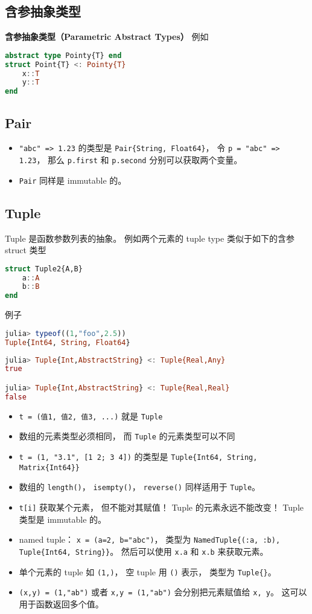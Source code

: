 \subsection{含参抽象类型}
\textbf{含参抽象类型（Parametric Abstract Types）}
例如
\begin{lstlisting}[language=julia]
abstract type Pointy{T} end
struct Point{T} <: Pointy{T}
    x::T
    y::T
end
\end{lstlisting}

\subsection{Pair}
\begin{itemize}
\item \verb|"abc" => 1.23| 的类型是 \verb|Pair{String, Float64}|， 令 \verb|p = "abc" => 1.23|， 那么 \verb|p.first| 和 \verb|p.second| 分别可以获取两个变量。
\item \verb|Pair| 同样是 immutable 的。
\end{itemize}


\subsection{Tuple}
Tuple 是函数参数列表的抽象。 例如两个元素的 tuple type 类似于如下的含参 struct 类型
\begin{lstlisting}[language=julia]
struct Tuple2{A,B}
    a::A
    b::B
end
\end{lstlisting}
例子
\begin{lstlisting}[language=julia]
julia> typeof((1,"foo",2.5))
Tuple{Int64, String, Float64}
\end{lstlisting}
\begin{lstlisting}[language=julia]
julia> Tuple{Int,AbstractString} <: Tuple{Real,Any}
true

julia> Tuple{Int,AbstractString} <: Tuple{Real,Real}
false
\end{lstlisting}

\begin{itemize}
\item \verb|t = (值1, 值2, 值3, ...)| 就是 \verb|Tuple|
\item 数组的元素类型必须相同， 而 \verb|Tuple| 的元素类型可以不同
\item \verb|t = (1, "3.1", [1 2; 3 4])| 的类型是 \verb|Tuple{Int64, String, Matrix{Int64}}|
\item 数组的 \verb|length()|， \verb|isempty()|， \verb|reverse()| 同样适用于 \verb|Tuple|。
\item \verb|t[i]| 获取某个元素， 但不能对其赋值！ Tuple 的元素永远不能改变！ Tuple 类型是 immutable 的。
\item named tuple： \verb|x = (a=2, b="abc")|， 类型为 \verb|NamedTuple{(:a, :b), Tuple{Int64, String}}|。 然后可以使用 \verb|x.a| 和 \verb|x.b| 来获取元素。
\item 单个元素的 tuple 如 \verb|(1,)|， 空 tuple 用 \verb|()| 表示， 类型为 \verb|Tuple{}|。
\item \verb|(x,y) = (1,"ab")| 或者 \verb|x,y = (1,"ab")| 会分别把元素赋值给 \verb|x, y|。 这可以用于函数返回多个值。
\end{itemize}

